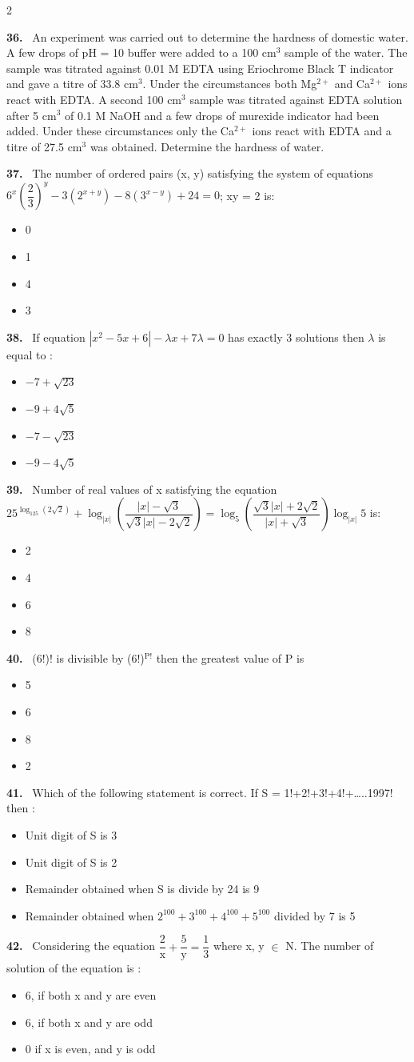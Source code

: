 \documentclass[10pt]{extarticle}
\newcommand{\papersec}[1]{\par\bigskip{\centering\Large\bfseries PAPER-#1\par}\medskip}
\newcommand{\partsec}[2]{\par\medskip\noindent{\large\bfseries PART-#1: #2}\par\smallskip}
\newcommand{\qn}[1]{\par\smallskip\noindent\textbf{#1.}~}
\newenvironment{qoptions}{\begin{itemize}[leftmargin=1.8em,itemsep=1pt,topsep=2pt,label={}]}{\end{itemize}}
\newcommand{\opt}[2]{\item[(#1)] #2}
\begin{document}
\begin{multicols}{2}
\qn{36} An experiment was carried out to determine the hardness of domestic water. A few drops of pH = 10 buffer were added to a 100 cm$^3$ sample of the water. The sample was titrated against 0.01 M EDTA using Eriochrome Black T indicator and gave a titre of 33.8 cm$^3$. Under the circumstances both Mg$^{2+}$ and Ca$^{2+}$ ions react with EDTA. A second 100 cm$^3$ sample was titrated against EDTA solution after 5 cm$^3$ of 0.1 M NaOH and a few drops of murexide indicator had been added. Under these circumstances only the Ca$^{2+}$ ions react with EDTA and a titre of 27.5 cm$^3$ was obtained. Determine the hardness of water.
\raggedcolumns
\papersec{1}
\partsec{3}{MATHEMATICS}
\qn{37} The number of ordered pairs (x, y) satisfying the system of equations $6^x\left(\dfrac23\right)^y-3(2^{x+y})-8(3^{x-y})+24=0$; xy = 2 is:
\begin{qoptions}
\opt{A}{0}
\opt{B}{1}
\opt{C}{4}
\opt{D}{3}
\end{qoptions}
\qn{38} If equation $|x^2-5x+6|-\lambda x+7\lambda=0$ has exactly 3 solutions then $\lambda$ is equal to :
\begin{qoptions}
\opt{A}{$-7+\sqrt{23}$}
\opt{B}{$-9+4\sqrt5$}
\opt{C}{$-7-\sqrt{23}$}
\opt{D}{$-9-4\sqrt5$}
\end{qoptions}
\qn{39} Number of real values of x satisfying the equation $25^{\log_{125}(2\sqrt2)}+\log_{|x|}\left(\dfrac{|x|-\sqrt3}{\sqrt3|x|-2\sqrt2}\right)=\log_5\left(\dfrac{\sqrt3|x|+2\sqrt2}{|x|+\sqrt3}\right)\log_{|x|}5$ is:
\begin{qoptions}
\opt{A}{2}
\opt{B}{4}
\opt{C}{6}
\opt{D}{8}
\end{qoptions}
\qn{40} (6!)! is divisible by (6!)$^{\mathrm P!}$ then the greatest value of P is
\begin{qoptions}
\opt{A}{5}
\opt{B}{6}
\opt{C}{8}
\opt{D}{2}
\end{qoptions}
\qn{41} Which of the following statement is correct. If S = 1!+2!+3!+4!+\dots..1997! then :
\begin{qoptions}
\opt{A}{Unit digit of S is 3}
\opt{B}{Unit digit of S is 2}
\opt{C}{Remainder obtained when S is divide by 24 is 9}
\opt{D}{Remainder obtained when $2^{100}+3^{100}+4^{100}+5^{100}$ divided by 7 is 5}
\end{qoptions}
\qn{42} Considering the equation $\dfrac2{\mathrm x}+\dfrac5{\mathrm y}=\dfrac13$ where x, y $\in$ N. The number of solution of the equation is :
\begin{qoptions}
\opt{A}{6, if both x and y are even}
\opt{B}{6, if both x and y are odd}
\opt{C}{0 if x is even, and y is odd}

\end{qoptions}
\end{multicols}
\end{document}
